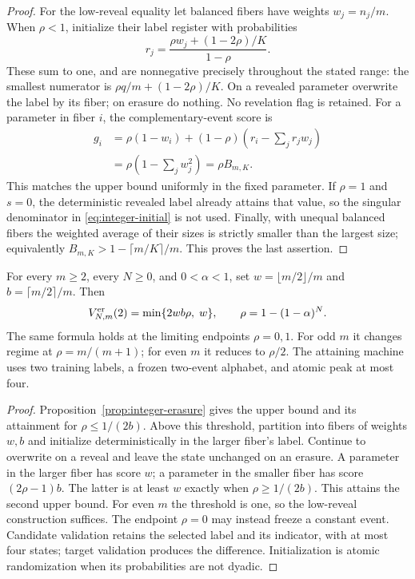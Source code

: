 \begin{proof}
For the low-reveal equality let balanced fibers have weights $w_j=n_j/m$.
When $\rho<1$, initialize their label register with probabilities
\begin{equation}\label{eq:integer-initial}
 r_j=\frac{\rho w_j+(1-2\rho)/K}{1-\rho}.
\end{equation}
These sum to one, and are nonnegative precisely throughout the stated
range: the smallest numerator is $\rho q/m+(1-2\rho)/K$.
On a revealed parameter overwrite the label by its fiber; on erasure
do nothing. No revelation flag is retained. For a parameter in fiber
$i$, the complementary-event score is
\begin{align*}
 g_i&=\rho(1-w_i)+(1-\rho)\left(r_i-\sum_jr_jw_j\right)\\
    &=\rho\left(1-\sum_jw_j^2\right)=\rho B_{m,K}.
\end{align*}
This matches the upper bound uniformly in the fixed parameter. If
$\rho=1$ and $s=0$, the deterministic revealed label already attains
that value, so the singular denominator in \eqref{eq:integer-initial}
is not used. Finally, with unequal balanced fibers the weighted average
of their sizes is strictly smaller than the largest size; equivalently
$B_{m,K}>1-\lceil m/K\rceil/m$. This proves the last assertion.
\end{proof}

\begin{theorem}\label{thm:two-label-erasure}
For every $m\ge2$, every $N\ge0$, and $0<\alpha<1$, set
$w=\lfloor m/2\rfloor/m$ and $b=\lceil m/2\rceil/m$. Then
\begin{equation}\label{eq:two-label-erasure}
 V^{\rm er}_{N,m}(2)=\min\{2wb\rho,\;w\},
                 \qquad \rho=1-(1-\alpha)^N.
\end{equation}
The same formula holds at the limiting endpoints $\rho=0,1$.
For odd $m$ it changes regime at $\rho=m/(m+1)$; for even $m$ it
reduces to $\rho/2$. The attaining machine uses two training labels,
a frozen two-event alphabet, and atomic peak at most four.
\end{theorem}
\begin{proof}
Proposition~\ref{prop:integer-erasure} gives the upper bound and its
attainment for $\rho\le1/(2b)$. Above this threshold, partition into
fibers of weights $w,b$ and initialize deterministically in the larger
fiber's label. Continue to overwrite on a reveal and leave the state
unchanged on an erasure. A parameter in the larger fiber has score
$w$; a parameter in the smaller fiber has score $(2\rho-1)b$.
The latter is at least $w$ exactly when $\rho\ge1/(2b)$.
This attains the second upper bound. For even $m$ the threshold is one,
so the low-reveal construction suffices. The endpoint $\rho=0$ may
instead freeze a constant event. Candidate validation retains the
selected label and its indicator, with at most four states; target
validation produces the difference. Initialization is atomic
randomization when its probabilities are not dyadic.
\end{proof}

